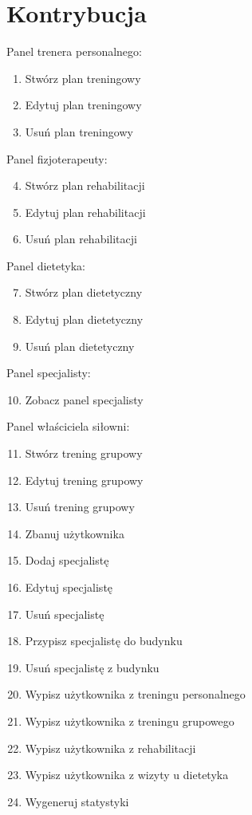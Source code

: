 \section{Kontrybucja}

{Panel trenera personalnego:}

\begin{enumerate}
\tightlist
\item
  {Stwórz plan treningowy}
\item
  {Edytuj plan treningowy}
\item
  {Usuń plan treningowy}
\end{enumerate}

{Panel fizjoterapeuty:}

\begin{enumerate}
\setcounter{enumi}{3}
\tightlist
\item
  {Stwórz plan rehabilitacji}
\item
  {Edytuj plan rehabilitacji}
\item
  {Usuń plan rehabilitacji}
\end{enumerate}

{Panel dietetyka:}

\begin{enumerate}
\setcounter{enumi}{6}
\tightlist
\item
  {Stwórz plan dietetyczny}
\item
  {Edytuj plan dietetyczny}
\item
  {Usuń plan dietetyczny}
\end{enumerate}

{Panel specjalisty:}

\begin{enumerate}
\setcounter{enumi}{9}
\tightlist
\item
  {Zobacz panel specjalisty}
\end{enumerate}

{Panel właściciela siłowni:}

\begin{enumerate}
\setcounter{enumi}{10}
\tightlist
\item
  {Stwórz trening grupowy}
\item
  {Edytuj trening grupowy}
\item
  {Usuń trening grupowy}
\item
  {Zbanuj użytkownika}
\item
  {Dodaj specjalistę}
\item
  {Edytuj specjalistę}
\item
  {Usuń specjalistę}
\item
  {Przypisz specjalistę do budynku}
\item
  {Usuń specjalistę z budynku}
\item
  {Wypisz użytkownika z treningu personalnego}
\item
  {Wypisz użytkownika z treningu grupowego}
\item
  {Wypisz użytkownika z rehabilitacji}
\item
  {Wypisz użytkownika z wizyty u dietetyka}
\item
  {Wygeneruj statystyki}
\end{enumerate}

